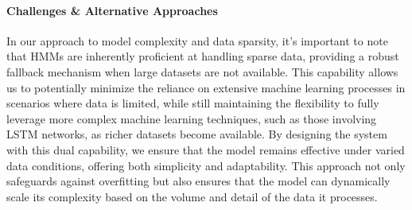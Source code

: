 %

\paragraph{Challenges \& Alternative Approaches}

In our approach to model complexity and data sparsity, it's important to note that HMMs are inherently proficient at handling sparse data, 
providing a robust fallback mechanism when large datasets are not available. 
This capability allows us to potentially minimize the reliance on extensive machine learning processes in scenarios where data is limited, 
while still maintaining the flexibility to fully leverage more complex machine learning techniques, 
such as those involving LSTM networks, as richer datasets become available. 
By designing the system with this dual capability, we ensure that the model remains effective under varied data conditions,
offering both simplicity and adaptability. 
This approach not only safeguards against overfitting but also ensures that the model can dynamically scale its complexity 
based on the volume and detail of the data it processes.
%